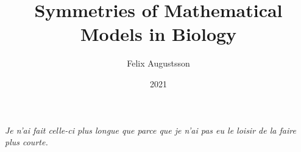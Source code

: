 \documentclass[a4paper, 11pt, twoside, openright]{report}
\title{Symmetries of Mathematical Models in Biology}
\author{Felix Augustsson}
\date{2021}
\begin{document}
\maketitle




\cleardoublepage
\thispagestyle{empty}
\null\vfill
\begin{center}
  \parbox{.5\textwidth}{%
    \raggedright{\itshape\large%
      Je n'ai fait celle-ci plus longue que parce que je n'ai pas eu le loisir de la faire plus courte.\par
    }
    \par%
  }
\end{center}
\vfill\vfill
\cleardoublepage
\tableofcontents

\cleardoublepage
{}
\setcounter{page}{1}















\appendix



\printbibliography[heading=bibintoc]
\end{document}
